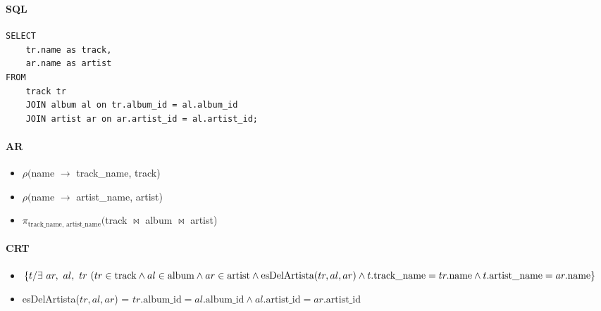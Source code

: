 \subsubsection{}
\paragraph{SQL}
\begin{verbatim}
SELECT
	tr.name as track,
	ar.name as artist
FROM
	track tr
	JOIN album al on tr.album_id = al.album_id
	JOIN artist ar on ar.artist_id = al.artist_id;
\end{verbatim}
\paragraph{AR}
\begin{itemize}
	\item[] $\rho($name $\rightarrow$ track\_name, track)
	\item[] $\rho($name $\rightarrow$ artist\_name, artist)
	\item[] $\pi_{\text{track\_name, artist\_name}}($track $\bowtie$ album $\bowtie$ artist)
\end{itemize}

\paragraph{CRT} 
\begin{itemize}
	\item[] $\{ t / \exists~ar,~al,~tr~(tr\in \text{track} \land
		al\in\text{album} \land ar\in\text{artist} \\ 
		\land \text{esDelArtista}(tr,al,ar) \land
		t.\text{track\_name} = tr.\text{name} \land t.\text{artist\_name} = ar.\text{name}\}
		$
	\item[] esDelArtista($tr,al,ar$) = $tr.\text{album\_id} = al.\text{album\_id}\land al.\text{artist\_id} = ar.\text{artist\_id}$ 
\end{itemize}

\newpage
\subsubsection{}
%
